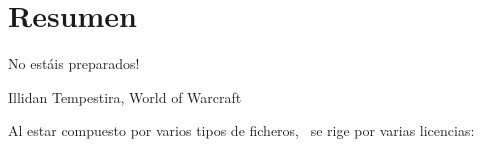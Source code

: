 %
%
%
%
%
%
%
%
%
%
%
%
%

\chapter{Resumen}

\begin{FraseCelebre}
\begin{Frase}
\textexclamdown No est\'ais preparados!
\end{Frase}
\begin{Fuente}
 Illidan Tempestira, World of Warcraft
\end{Fuente}
\end{FraseCelebre}



\medskip

Al estar compuesto por varios tipos de ficheros, \texis\ se rige por varias licencias:

\medskip

